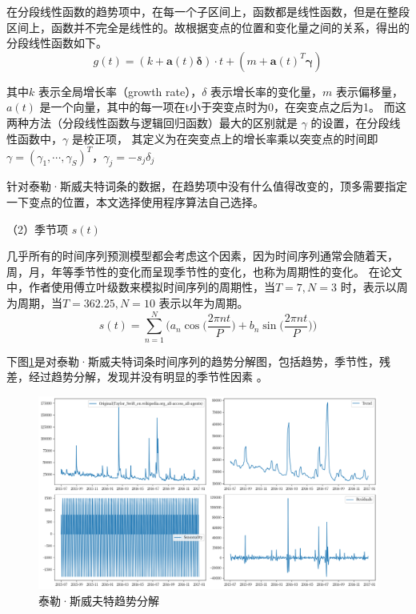 在分段线性函数的趋势项中，在每一个子区间上，函数都是线性函数，但是在整段区间上，函数并不完全是线性的。故根据变点的位置和变化量之间的关系，得出的分段线性函数如下。
\begin{equation}
	g(t) = (k + \mathbf{a}(t)\mathbf{\delta}) \cdot t + (m + \mathbf{a}(t)^T\mathbf{\gamma})
\end{equation}

其中$k$ 表示全局增长率（growth rate），$\delta$ 表示增长率的变化量，$m$ 表示偏移量，$a(t)$ 是一个向量，其中的每一项在t小于突变点时为0，在突变点之后为1。
而这两种方法（分段线性函数与逻辑回归函数）最大的区别就是 $\gamma$ 的设置，在分段线性函数中，$\gamma$ 是校正项，
其定义为在突变点上的增长率乘以突变点的时间即 $\gamma=(\gamma_{1},\cdots,\gamma_{S})^{T}$，$\gamma_{j}=-s_{j}\delta_{j}$

针对泰勒·斯威夫特词条的数据，在趋势项中没有什么值得改变的，顶多需要指定一下变点的位置，本文选择使用程序算法自己选择。

（2）季节项 $s(t)$

几乎所有的时间序列预测模型都会考虑这个因素，因为时间序列通常会随着天，周，月，年等季节性的变化而呈现季节性的变化，也称为周期性的变化。
在论文中\cite{taylor2018forecasting}，作者使用傅立叶级数来模拟时间序列的周期性，当$T = 7, N = 3$ 时，表示以周为周期，当$T = 362.25, N = 10$ 表示以年为周期。
\begin{equation}
	s(t) = \sum_{n=1}^{N}\bigg( a_{n}\cos\bigg(\frac{2\pi n t}{P}\bigg) + b_{n}\sin\bigg(\frac{2\pi n t}{P}\bigg)\bigg)
\end{equation}

下图\ref{Trend-decomposition}是对泰勒·斯威夫特词条时间序列的趋势分解图，包括趋势，季节性，残差，经过趋势分解，发现并没有明显的季节性因素
。

\begin{figure}[htb]
	\centering
	\includegraphics[width=\textwidth]{figures/Trend-decomposition.png}
	\caption{泰勒·斯威夫特趋势分解}
	\label{Trend-decomposition}
\end{figure}

